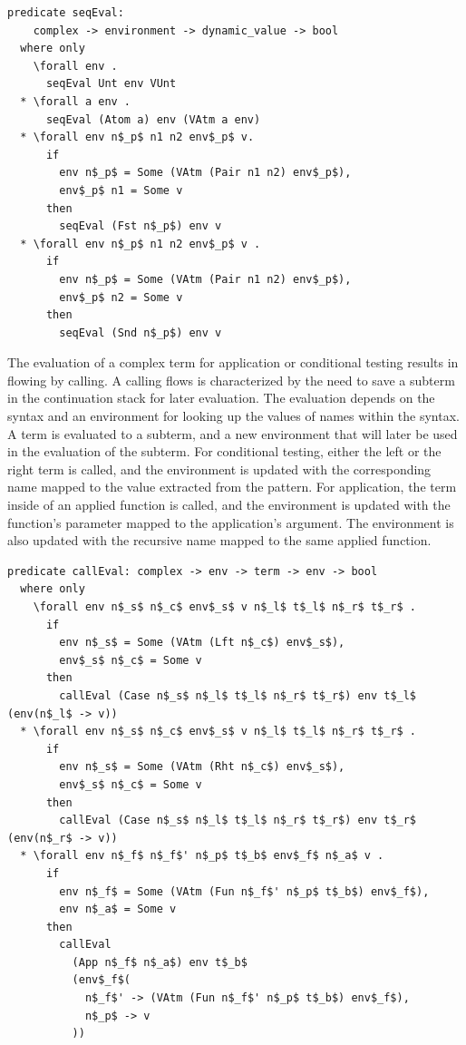 \documentclass[letterpaper, 11pt]{extarticle}
\begin{document}
\begin{lstlisting}[language=logic, mathescape]
  predicate seqEval:
    complex -> environment -> dynamic_value -> bool
  where only
    \forall env . 
      seqEval Unt env VUnt
  * \forall a env .
      seqEval (Atom a) env (VAtm a env)
  * \forall env n$_p$ n1 n2 env$_p$ v. 
      if
        env n$_p$ = Some (VAtm (Pair n1 n2) env$_p$),
        env$_p$ n1 = Some v
      then
        seqEval (Fst n$_p$) env v
  * \forall env n$_p$ n1 n2 env$_p$ v . 
      if
        env n$_p$ = Some (VAtm (Pair n1 n2) env$_p$), 
        env$_p$ n2 = Some v 
      then
        seqEval (Snd n$_p$) env v
\end{lstlisting}

The evaluation of a complex term for application or conditional testing
results in flowing by calling. A calling flows is characterized
by the need to save a subterm in the continuation stack for later evaluation.
The evaluation depends on the syntax
and an environment for looking up the values of names within the syntax.
A term is evaluated to a subterm, and a new environment that will
later be used in the evaluation of the subterm. For conditional testing, either the left or the right
term is called, and the environment is updated with the corresponding name mapped to the
value extracted from the pattern. For application, the term inside of an applied function 
is called, and the environment is updated with the function's parameter mapped to the
application's argument. The environment is also updated with the recursive name mapped to the
same applied function.

\begin{lstlisting}[language=logic, mathescape]
  predicate callEval: complex -> env -> term -> env -> bool
  where only
    \forall env n$_s$ n$_c$ env$_s$ v n$_l$ t$_l$ n$_r$ t$_r$ .
      if
        env n$_s$ = Some (VAtm (Lft n$_c$) env$_s$),
        env$_s$ n$_c$ = Some v
      then
        callEval (Case n$_s$ n$_l$ t$_l$ n$_r$ t$_r$) env t$_l$ (env(n$_l$ -> v))
  * \forall env n$_s$ n$_c$ env$_s$ v n$_l$ t$_l$ n$_r$ t$_r$ .
      if 
        env n$_s$ = Some (VAtm (Rht n$_c$) env$_s$),
        env$_s$ n$_c$ = Some v
      then
        callEval (Case n$_s$ n$_l$ t$_l$ n$_r$ t$_r$) env t$_r$ (env(n$_r$ -> v))
  * \forall env n$_f$ n$_f$' n$_p$ t$_b$ env$_f$ n$_a$ v .
      if 
        env n$_f$ = Some (VAtm (Fun n$_f$' n$_p$ t$_b$) env$_f$),
        env n$_a$ = Some v
      then
        callEval
          (App n$_f$ n$_a$) env t$_b$
          (env$_f$(
            n$_f$' -> (VAtm (Fun n$_f$' n$_p$ t$_b$) env$_f$),
            n$_p$ -> v
          ))
\end{lstlisting}
  
\end{document}
